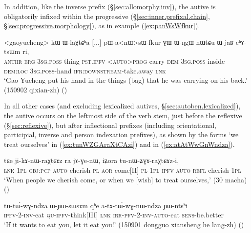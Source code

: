 In addition, like the inverse prefix (§\ref{sec:allomorphy.inv}), the autive is obligatorily infixed within the progressive  (§\ref{sec:inner.prefixal.chain}, §\ref{sec:progressive.morphology}), as in example (\ref{ex:panWsWfkur}). 

 \begin{exe}
\ex \label{ex:panWsWfkur}
\gll <gaoyucheng> kɯ ɯ-laχtɕʰa [...] pɯ-a<nɯ>sɯ-fkur ɣɯ ɯ-ŋgɯ nɯtɕu ɯ-jaʁ cʰɤ-tsɯm ri,\\
\textsc{anthr} \textsc{erg} \textsc{3sg}.\textsc{poss}-thing { } \textsc{pst}.\textsc{ipfv}-<\textsc{auto}>\textsc{prog}-carry \textsc{dem} \textsc{3sg}.\textsc{poss}-inside \textsc{dem}:\textsc{loc} \textsc{3sg}.\textsc{poss}-hand \textsc{ifr}:\textsc{downstream}-take.away \textsc{lnk}\\
\glt `Gao Yucheng put his hand in the things (bag) that he was carrying on his back.' (150902 qixian-zh)
()
\end{exe}

In all other cases (and excluding lexicalized autives, §\ref{sec:autoben.lexicalized}), the autive  occurs on the leftmost side of the verb stem, just before the reflexive (§\ref{sec:reflexive}), but after inflectional prefixes (including orientational, participial, inverse and person indexation prefixes), as shown by the forms  `we treat ourselves' in (\ref{ex:tunWZGAraXtCAzi}) and  in (\ref{ex:atAtWwGnWndza}).

\begin{exe}
\ex \label{ex:tunWZGAraXtCAzi}
\gll  tɕe ji-kɤ-nɯ-raχtɕɤz ra jɤ-ɣe-nɯ, iʑora tu-nɯ-ʑɣɤ-raχtɕɤz-i,  \\
\textsc{lnk} \textsc{1pl}-\textsc{obj}:\textsc{pcp}-\textsc{auto}-cherish \textsc{pl} \textsc{aor}-come[II]-\textsc{pl} \textsc{1pl} \textsc{ipfv}-\textsc{auto}-\textsc{refl}-cherish-\textsc{1pl} \\
\glt `When people we cherish come, or when we [wish] to treat ourselves,' (30 macha)
()
\end{exe}

\begin{exe}
\ex \label{ex:atAtWwGnWndza}
\gll tu-tɯ́-wɣ-ndza ɯ-ɲɯ-sɯsɤm qʰe a-tɤ-tɯ́-wɣ-nɯ-ndza ɲɯ-ntsʰi \\
\textsc{ipfv}-2-\textsc{inv}-eat \textsc{qu}-\textsc{ipfv}-think[III] \textsc{lnk} \textsc{irr}-\textsc{pfv}-2-\textsc{inv}-\textsc{auto}-eat \textsc{sens}-be.better \\
\glt  `If it wants to eat you, let it eat you!'  (150901 dongguo xiansheng he lang-zh)
()
\end{exe}

